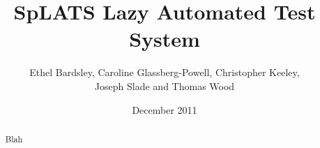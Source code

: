 \documentclass{report}
\title{SpLATS Lazy Automated Test System}
\author{Ethel Bardsley, Caroline Glassberg-Powell, Christopher Keeley,\\ Joseph Slade and Thomas Wood}
\date{December 2011}
\begin{document}
\maketitle

\begin{abstract}
Blah
\end{abstract}










\end{document}
